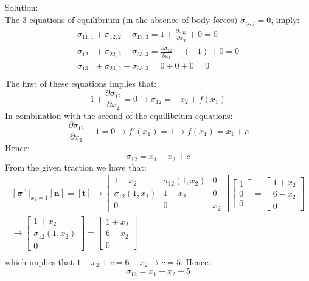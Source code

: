 \documentclass{article}
\newcommand{\ee}{\end{equation}}
\newcommand{\be}{\begin{equation}}
\newcommand{\pa}{\partial}
\newcommand{\bs}{\boldsymbol}
\begin{document}
\begin{enumerate}
\underline{Solution:} \\
The 3 equations of equilibrium (in the absence of body forces)  $\sigma_{ij,j}=0$, imply:
\be
\begin{array}{l}
 \sigma_{11,1}+\sigma_{12,2}+\sigma_{13,3}=1+\frac{\pa \sigma_{12}}{\pa x_2}+0=0 \\
  \sigma_{12,1}+\sigma_{22,2}+\sigma_{23,3}=\frac{\pa \sigma_{12}}{\pa x_1}+(-1)+0=0 \\
   \sigma_{13,1}+\sigma_{23,2}+\sigma_{33,3}=0+0+0=0 \\
\end{array}
\ee
The first of these equations implies that:
\be
1+\frac{\pa \sigma_{12}}{\pa x_2}=0 \to \sigma_{12}=-x_2+f(x_1)
\ee
In combination with the second of the equilibrium equations:
\be
\frac{\pa \sigma_{12}}{\pa x_1}-1=0 \to f'(x_1)=1 \to f(x_1)=x_1+c
\ee
Hence:
\be
\sigma_{12}=x_1-x_2+c
\ee
From the given traction we have that:
\be
\begin{array}{l}
[\bs{\sigma}]|_{x_1=1} [\bs{n}]=[\bs{t}] \to \left[\begin{array}{ccc} 1+x_2 & \sigma_{12}(1,x_2) & 0 \\  \sigma_{12}(1,x_2) & 1-x_2 & 0 \\ 0 & 0 & x_2 \end{array} \right] \left[\begin{array}{c} 1 \\ 0 \\ 0 \end{array} \right]=  \left[\begin{array}{c} 1+x_2\\ 6-x_2 \\ 0 \end{array} \right]  \\
\to \left[\begin{array}{c} 1+x_2 \\ \sigma_{12}(1,x_2) \\ 0 \end{array} \right]=  \left[\begin{array}{c} 1+x_2 \\ 6-x_2 \\ 0 \end{array} \right] \\
\end{array}
\ee
which implies that $1-x_2+c=6-x_2 \to c=5$. Hence:
\be
\sigma_{12}=x_1-x_2+5
\ee


\end{enumerate}
\end{document}

